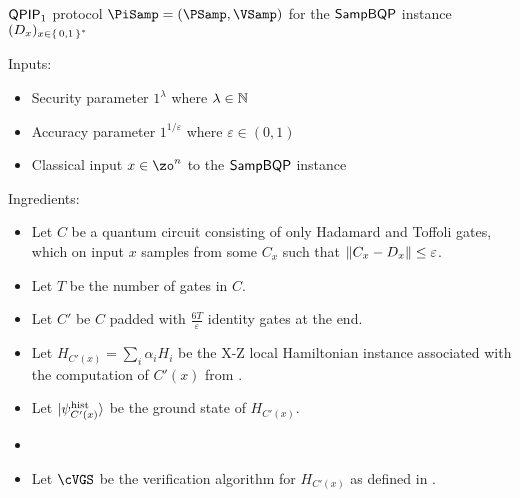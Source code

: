 \begin{protocol}{$\operatorname{\mathsf{QPIP}}_1$ protocol $\PiSamp=(\PSamp, \VSamp)$ for the $\operatorname{\mathsf{SampBQP}}$ instance $(D_x)_{x\in\set{0, 1}^*}$}
	\label{ProtoQPIP1}

	Inputs:
	\begin{itemize}
		\item Security parameter $1^\lambda$ where $\lambda\in\mathbb{N}$
		\item Accuracy parameter $1^{1/\varepsilon}$ where $\varepsilon\in(0, 1)$
		\item Classical input $x\in\zo^n$ to the $\operatorname{\mathsf{SampBQP}}$ instance
	\end{itemize}

	Ingredients:
	\begin{itemize}
		\item Let $C$ be a quantum circuit consisting of only Hadamard and Toffoli gates, which on input $x$ samples from some $C_x$ such that $\left\lVert C_x-D_x\right\rVert\leq\varepsilon$.
		\item Let $T$ be the number of gates in $C$.
		\item Let $C'$ be $C$ padded with $\frac{6T}{\varepsilon}$ identity gates at the end.
		\item Let $H_{C'(x)}=\sum_i \alpha_i H_i$ be the X-Z local Hamiltonian instance associated with the computation of $C'(x)$ from .
		\item Let $\ket{\psi_{{C'(x)}}^{\mathrm{hist}}}$ be the ground state of $H_{C'(x)}$.
		\item {} 
		\item Let $\cVGS$ be the verification algorithm for $H_{C'(x)}$ as defined in .
	\end{itemize}


\end{protocol}
